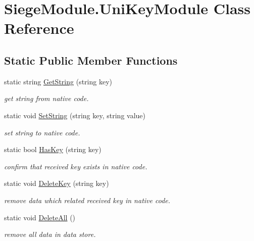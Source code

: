 \hypertarget{class_siege_module_1_1_uni_key_module}{}\section{Siege\+Module.\+Uni\+Key\+Module Class Reference}
\label{class_siege_module_1_1_uni_key_module}
\subsection*{Static Public Member Functions}
\begin{DoxyCompactItemize}
\item 
static string \mbox{\hyperlink{class_siege_module_1_1_uni_key_module_a26c856f2a81d3c561295afb1936fed37}{Get\+String}} (string key)
\begin{DoxyCompactList}\small\item\em get string from native code. \end{DoxyCompactList}\item 
static void \mbox{\hyperlink{class_siege_module_1_1_uni_key_module_ab17cd59318975668525fcf694b5dd88d}{Set\+String}} (string key, string value)
\begin{DoxyCompactList}\small\item\em set string to native code. \end{DoxyCompactList}\item 
static bool \mbox{\hyperlink{class_siege_module_1_1_uni_key_module_a55044c9eefa50b2157b1214903616fdc}{Has\+Key}} (string key)
\begin{DoxyCompactList}\small\item\em confirm that received key exists in native code. \end{DoxyCompactList}\item 
static void \mbox{\hyperlink{class_siege_module_1_1_uni_key_module_a1a14008fba02dd38b420879a97d2ed21}{Delete\+Key}} (string key)
\begin{DoxyCompactList}\small\item\em remove data which related received key in native code. \end{DoxyCompactList}\item 
static void \mbox{\hyperlink{class_siege_module_1_1_uni_key_module_a04963e00a7581e30722e42039eadb923}{Delete\+All}} ()
\begin{DoxyCompactList}\small\item\em remove all data in data store. \end{DoxyCompactList}\end{DoxyCompactItemize}


